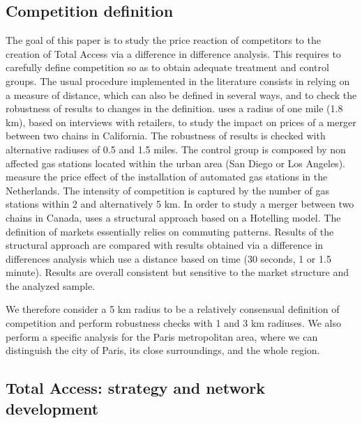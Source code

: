 \documentclass[english]{article}
\begin{document}
\subsection{Competition definition}

The goal of this paper is to study the price reaction of competitors to the creation of Total Access via a difference in difference analysis. This requires to carefully define competition so as to obtain adequate treatment and control groups. The usual procedure implemented in the literature consists in relying on a measure of distance, which can also be defined in several ways, and to check the robustness of results to changes in the definition. \cite{HAS04} uses a radius of one mile (1.8 km), based on interviews with retailers, to study the impact on prices of a merger between two chains in California. The robustness of results is checked with alternative radiuses of 0.5 and 1.5 miles. The control group is composed by non affected gas stations located within the urban area (San Diego or Los Angeles). \cite{BRU15} measure the price effect of the installation of automated gas stations in the Netherlands. The intensity of competition is captured by the number of gas stations within 2 and alternatively 5 km. In order to study a merger between two chains in Canada, \cite{HOU12} uses a structural approach based on a Hotelling model. The definition of markets essentially relies on commuting patterns. Results of the structural approach are compared with results obtained via a difference in differences analysis which use a distance based on time (30 seconds, 1 or 1.5 minute). Results are overall consistent but sensitive to the market structure and the analyzed sample.

We therefore consider a 5 km radius to be a relatively consensual definition of competition and perform robustness checks with 1 and 3 km radiuses. We also perform a specific analysis for the Paris metropolitan area, where we can distinguish the city of Paris, its close surroundings, and the whole region.

\subsection{Total Access: strategy and network development}
\end{document}
